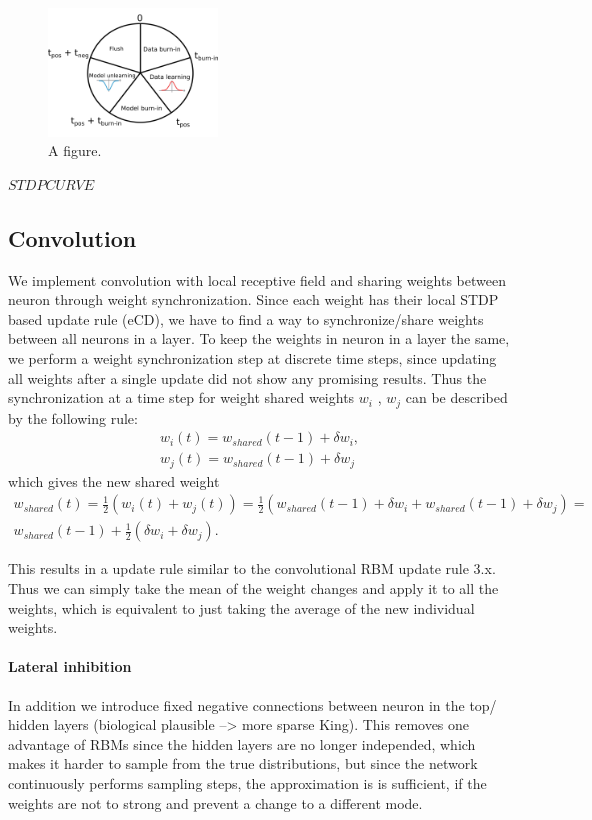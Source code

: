 \begin{figure}
	\centering
    	\includegraphics[width=0.4\textwidth]{imgs/eCD_5phases.png} 
    \caption{A figure.}
	\label{fig:test}
\end{figure}

$STDP CURVE$

\subsection{Convolution}

We implement convolution with local receptive field and sharing weights between neuron through weight synchronization.
Since each weight has their local STDP based update rule (eCD), we have to find a way to synchronize/share weights between all neurons in a layer.
To keep the weights in neuron in a layer the same, we perform a weight synchronization step at discrete time steps, since updating all weights after a single update did not show any promising results.
Thus the synchronization at a time step for weight shared weights $w_i$ , $w_j$ can be described by the following rule:  
\[
\begin{split}
w_i(t) = w_{shared}(t-1) + \delta w_i, \\ 
w_j(t) = w_{shared}(t-1) + \delta w_j 
\end{split}
\]
which gives the new shared weight
\[
\begin{split}
w_{shared}(t) = \frac{1}{2} (w_i(t) + w_j(t) ) = \frac{1}{2} (w_{shared}(t-1) + \delta w_i + w_{shared}(t-1) + \delta w_j) = \\ w_{shared}(t-1) + \frac{1}{2} (\delta w_i + \delta w_j).
\end{split}
\]

This results in a update rule similar to the convolutional RBM update rule 3.x.
Thus we can simply take the mean of the weight changes and apply it to all the weights, which is equivalent to just taking the average of the new individual weights. 

\paragraph{Lateral inhibition}
In addition we introduce fixed negative connections between neuron in the top/ hidden layers (biological plausible --> more sparse King).
This removes one advantage of RBMs since the hidden layers are no longer independed, which makes it harder to sample from the true distributions, but since the network continuously performs sampling steps, the approximation is is sufficient, if the weights are not to strong and prevent a change to a different mode.


